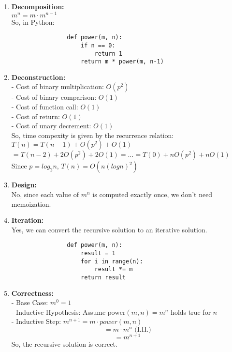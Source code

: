 \documentclass[a4paper]{article}
\begin{document}
\begin{enumerate}
\begin{enumerate}
\begin{enumerate}
            \item \textbf{Decomposition:} \\
            $m^n = m \cdot m^{n-1}$ \\
            So, in Python:
            \lstset{language=Python}
            \begin{lstlisting}
                def power(m, n):
                    if n == 0:
                        return 1
                    return m * power(m, n-1)
            \end{lstlisting}

            \item \textbf{Deconstruction:} \\
            - Cost of binary multiplication: $O(p^2)$ \\
            - Cost of binary comparison: $O(1)$ \\
            - Cost of function call: $O(1)$ \\
            - Cost of return: $O(1)$ \\
            - Cost of unary decrement: $O(1)$ \\

            So, time compexity is given by the recurrence relation: $T(n) = T(n-1) + O(p^2) + O(1)$ \\
            $ = T(n-2) + 2O(p^2) + 2O(1) = \dots = T(0) + nO(p^2) + nO(1)$ \\
            Since $p = log_2 n$, $T(n) = O(n(logn)^2)$ \\

            \item \textbf{Design:} \\
            No, since each value of $m^n$ is computed exactly once, we don't need memoization. \\

            \item \textbf{Iteration:} \\
            Yes, we can convert the recursive solution to an iterative solution.
            \lstset{language=Python}
            \begin{lstlisting}
                def power(m, n):
                    result = 1
                    for i in range(n):
                        result *= m
                    return result
            \end{lstlisting}

            \item \textbf{Correctness:} \\
            - Base Case: $m^0 = 1$ \\
            - Inductive Hypothesis: Assume $\text{power}(m, n) = m^n$ holds true for $n$ \\
            - Inductive Step: $m^{n+1} = m \cdot power(m, n)$
            \[= m \cdot m^n \text{  (I.H.)}\]
            \[= m^{n+1}\]
            So, the recursive solution is correct. \\
        \end{enumerate}
    \end{enumerate}


\end{enumerate}
\end{document}
